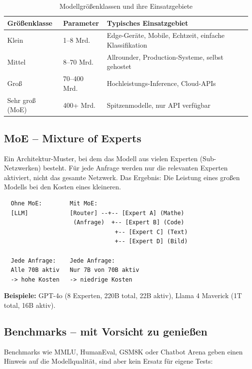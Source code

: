 \begin{table}[H]
\centering
\begin{tabularx}{\linewidth}{lXX}
\toprule
\textbf{Größenklasse} & \textbf{Parameter} & \textbf{Typisches Einsatzgebiet} \\
\midrule
Klein & 1--8 Mrd. & Edge-Geräte, Mobile, Echtzeit, einfache Klassifikation \\
Mittel & 8--70 Mrd. & Allrounder, Production-Systeme, selbst gehostet \\
Groß & 70--400 Mrd. & Hochleistungs-Inference, Cloud-APIs \\
Sehr groß (MoE) & 400+ Mrd. & Spitzenmodelle, nur API verfügbar \\
\bottomrule
\end{tabularx}
\caption{Modellgrößenklassen und ihre Einsatzgebiete}
\label{tab:modellgroessen}
\end{table}

\subsection{MoE -- Mixture of Experts}

Ein Architektur-Muster, bei dem das Modell aus vielen \glqq Experten\grqq{} (Sub-Netzwerken) besteht. Für jede Anfrage werden nur die relevanten Experten aktiviert, nicht das gesamte Netzwerk. Das Ergebnis: Die Leistung eines großen Modells bei den Kosten eines kleineren.

\begin{verbatim}
  Ohne MoE:        Mit MoE:
  [LLM]            [Router] --+-- [Expert A] (Mathe)
                    (Anfrage)  +-- [Expert B] (Code)
                                +-- [Expert C] (Text)
                                +-- [Expert D] (Bild)

  Jede Anfrage:    Jede Anfrage:
  Alle 70B aktiv   Nur 7B von 70B aktiv
  -> hohe Kosten   -> niedrige Kosten
\end{verbatim}

\textbf{Beispiele:} GPT-4o (8 Experten, 220B total, 22B aktiv), Llama 4 Maverick (1T total, 16B aktiv).

\subsection{Benchmarks -- mit Vorsicht zu genießen}

Benchmarks wie MMLU, HumanEval, GSM8K oder Chatbot Arena geben einen Hinweis auf die Modellqualität, sind aber kein Ersatz für eigene Tests:

